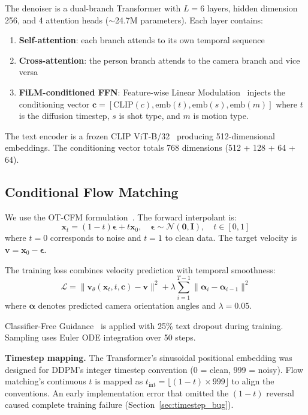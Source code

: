 \documentclass[10pt,twocolumn,letterpaper]{article}
\begin{document}
The denoiser is a dual-branch Transformer with $L = 6$ layers, hidden dimension 256, and 4 attention heads ($\sim$24.7M parameters). Each layer contains:

\begin{enumerate}
\item \textbf{Self-attention}: each branch attends to its own temporal sequence
\item \textbf{Cross-attention}: the person branch attends to the camera branch and vice versa
\item \textbf{FiLM-conditioned FFN}: Feature-wise Linear Modulation~\cite{perez2018film} injects the conditioning vector $\mathbf{c} = [\text{CLIP}(c), \text{emb}(t), \text{emb}(s), \text{emb}(m)]$ where $t$ is the diffusion timestep, $s$ is shot type, and $m$ is motion type.
\end{enumerate}

The text encoder is a frozen CLIP ViT-B/32~\cite{radford2021clip} producing 512-dimensional embeddings. The conditioning vector totals 768 dimensions (512 + 128 + 64 + 64).

\subsection{Conditional Flow Matching}

We use the OT-CFM formulation~\cite{lipman2023flow}. The forward interpolant is:
\begin{equation}
\mathbf{x}_t = (1 - t) \boldsymbol{\epsilon} + t \mathbf{x}_0, \quad \boldsymbol{\epsilon} \sim \mathcal{N}(\mathbf{0}, \mathbf{I}), \quad t \in [0, 1]
\end{equation}
where $t = 0$ corresponds to noise and $t = 1$ to clean data. The target velocity is $\mathbf{v} = \mathbf{x}_0 - \boldsymbol{\epsilon}$.

The training loss combines velocity prediction with temporal smoothness:
\begin{equation}
\mathcal{L} = \| \mathbf{v}_\theta(\mathbf{x}_t, t, \mathbf{c}) - \mathbf{v} \|^2 + \lambda \sum_{i=1}^{T-1} \| \boldsymbol{\alpha}_i - \boldsymbol{\alpha}_{i-1} \|^2
\end{equation}
where $\boldsymbol{\alpha}$ denotes predicted camera orientation angles and $\lambda = 0.05$.

Classifier-Free Guidance~\cite{ho2022cfg} is applied with 25\% text dropout during training. Sampling uses Euler ODE integration over 50 steps.

\textbf{Timestep mapping.} The Transformer's sinusoidal positional embedding was designed for DDPM's integer timestep convention (0 = clean, 999 = noisy). Flow matching's continuous $t$ is mapped as $t_\text{int} = \lfloor (1 - t) \times 999 \rfloor$ to align the conventions. An early implementation error that omitted the $(1-t)$ reversal caused complete training failure (Section~\ref{sec:timestep_bug}).
\end{document}
